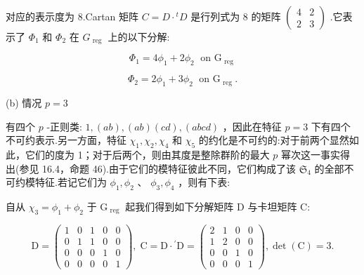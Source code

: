 \documentclass[10pt]{article}
\begin{document}
对应的表示度为 8.Cartan 矩阵 \(C = D \cdot  {}^{t}D\) 是行列式为 8 的矩阵 \(\left( \begin{array}{ll} 4 & 2 \\  2 & 3 \end{array}\right)\) .它表示了 \({\Phi }_{1}\) 和 \({\Phi }_{2}\) 在 \({G}_{\text{ reg }}\) 上的以下分解:

\[
{\Phi }_{1} = 4{\phi }_{1} + 2{\phi }_{2}\;\text{ on }{\mathrm{G}}_{\text{ reg }}
\]

\[
{\Phi }_{2} = 2{\phi }_{1} + 3{\phi }_{2}\;\text{ on }{\mathrm{G}}_{\text{ reg }}.
\]

(b) 情况 \(p = 3\)

有四个 \(p\) -正则类: \(1,\left( {ab}\right) ,\left( {ab}\right) \left( {cd}\right) ,\left( {abcd}\right)\) ，因此在特征 \(p = 3\) 下有四个不可约表示.另一方面，特征 \({\chi }_{1},{\chi }_{2},{\chi }_{4}\) 和 \({\chi }_{5}\) 的约化是不可约的:对于前两个显然如此，它们的度为 1；对于后两个，则由其度是整除群阶的最大 \(p\) 幂次这一事实得出(参见 16.4，命题 46).由于它们的模特征彼此不同，它们构成了该 \({\mathfrak{S}}_{4}\) 的全部不可约模特征.若记它们为 \({\phi }_{1},{\phi }_{2}\) 、 \({\phi }_{3},{\phi }_{4}\) ，则有下表:

\begin{center}
\end{center}

自从 \({\chi }_{3} = {\phi }_{1} + {\phi }_{2}\) 于 \({\mathrm{G}}_{\text{ reg }}\) 起我们得到如下分解矩阵 D 与卡坦矩阵 C:

\[
\mathrm{D} = \left( \begin{array}{lllll} 1 & 0 & 1 & 0 & 0 \\  0 & 1 & 1 & 0 & 0 \\  0 & 0 & 0 & 1 & 0 \\  0 & 0 & 0 & 0 & 1 \end{array}\right) ,\;\mathrm{C} = \mathrm{D} \cdot  {}^{\prime }\mathrm{D} = \left( \begin{array}{llll} 2 & 1 & 0 & 0 \\  1 & 2 & 0 & 0 \\  0 & 0 & 1 & 0 \\  0 & 0 & 0 & 1 \end{array}\right) ,\det \left( \mathrm{C}\right)  = 3.
\]
\end{document}
